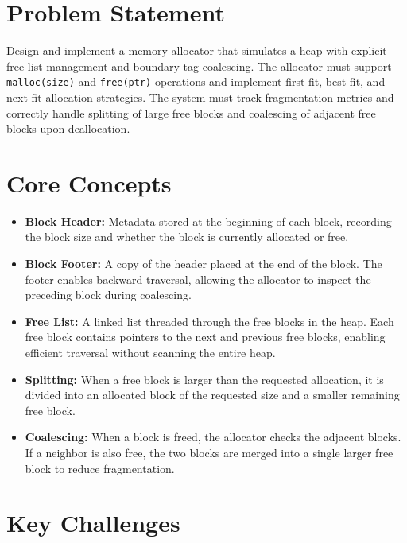 \section{Problem Statement}

Design and implement a memory allocator that simulates a heap with explicit free list management and boundary tag coalescing. The allocator must support \texttt{malloc(size)} and \texttt{free(ptr)} operations and implement first-fit, best-fit, and next-fit allocation strategies. The system must track fragmentation metrics and correctly handle splitting of large free blocks and coalescing of adjacent free blocks upon deallocation.

\section{Core Concepts}

\begin{itemize}
  \item \textbf{Block Header:} Metadata stored at the beginning of each block, recording the block size and whether the block is currently allocated or free.
  \item \textbf{Block Footer:} A copy of the header placed at the end of the block. The footer enables backward traversal, allowing the allocator to inspect the preceding block during coalescing.
  \item \textbf{Free List:} A linked list threaded through the free blocks in the heap. Each free block contains pointers to the next and previous free blocks, enabling efficient traversal without scanning the entire heap.
  \item \textbf{Splitting:} When a free block is larger than the requested allocation, it is divided into an allocated block of the requested size and a smaller remaining free block.
  \item \textbf{Coalescing:} When a block is freed, the allocator checks the adjacent blocks. If a neighbor is also free, the two blocks are merged into a single larger free block to reduce fragmentation.
\end{itemize}

\section{Key Challenges}

